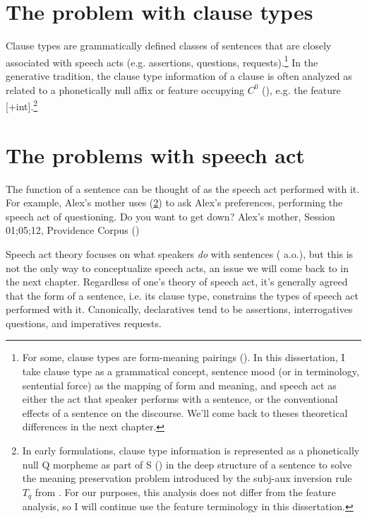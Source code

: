 \section{The problem with clause types}

Clause types are grammatically defined classes of sentences that are closely associated with speech acts (e.g. assertions, questions, requests).\footnote{For some, clause types are form-meaning pairings (\cite{sz1985speechact, ginzburgsag2000interrogative}). In this dissertation, I take clause type as a grammatical concept, sentence mood (or in \textcite['s]{chierchia1990textbook} terminology, sentential force) as the mapping of form and meaning, and speech act as either the act that speaker performs with a sentence, or the conventional effects of a sentence on the discourse. We'll come back to theses theoretical differences in the next chapter.} In the generative tradition, the clause type information of a clause is often analyzed as related to a phonetically null affix or feature occupying $C^{0}$ (\cite{chomsky1995minimalist, cheng1991, rizzi1997, rizzi2001int, chomskylasnik1977,platzack1997imp,akmajian1984clausetype, han1998imp}), e.g. the feature [+int].\footnote{In early formulations, clause type information is represented as a phonetically null Q morpheme as part of S (\cite{katzpostal1964, baker1970int}) in the deep structure of a sentence to solve the meaning preservation problem introduced by the subj-aux inversion rule $T_{q}$ from \textcite{chomsky1957}. For our purposes, this analysis does not differ from the feature analysis, so I will continue use the feature terminology in this dissertation.} 


\section{The problems with speech act}
The function of a sentence can be thought of as the speech act performed with it. For example, Alex's mother uses (\ref{}) to ask Alex's preferences, performing the speech act of questioning.
\bex{}
Do you want to get down? \hfill Alex's mother, Session 01;05;12, Providence Corpus (\cite{ProvidenceCorpus})
\eex

Speech act theory focuses on what speakers \emph{do} with sentences (\cite{austin1975things, searle1969} a.o.), but this is not the only way to conceptualize speech acts, an issue we will come back to in the next chapter. Regardless of one's theory of speech act, it's generally agreed that the form of a sentence, i.e. its clause type, constrains the types of speech act performed with it. Canonically, declaratives tend to be assertions, interrogatives questions, and imperatives requests. 


